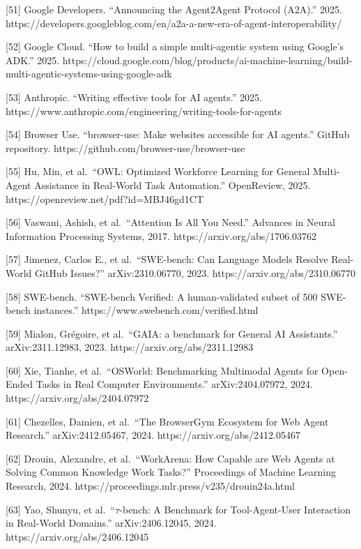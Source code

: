 {[}51{]} Google Developers. ``Announcing the Agent2Agent Protocol
(A2A).'' 2025.
https://developers.googleblog.com/en/a2a-a-new-era-of-agent-interoperability/

{[}52{]} Google Cloud. ``How to build a simple multi-agentic system
using Google's ADK.'' 2025.
https://cloud.google.com/blog/products/ai-machine-learning/build-multi-agentic-systems-using-google-adk

{[}53{]} Anthropic. ``Writing effective tools for AI agents.'' 2025.
https://www.anthropic.com/engineering/writing-tools-for-agents

{[}54{]} Browser Use. ``browser-use: Make websites accessible for AI
agents.'' GitHub repository. https://github.com/browser-use/browser-use

{[}55{]} Hu, Min, et al.~``OWL: Optimized Workforce Learning for General
Multi-Agent Assistance in Real-World Task Automation.'' OpenReview,
2025. https://openreview.net/pdf?id=MBJ46gd1CT

{[}56{]} Vaswani, Ashish, et al.~``Attention Is All You Need.'' Advances
in Neural Information Processing Systems, 2017.
https://arxiv.org/abs/1706.03762

{[}57{]} Jimenez, Carlos E., et al.~``SWE-bench: Can Language Models
Resolve Real-World GitHub Issues?'' arXiv:2310.06770, 2023.
https://arxiv.org/abs/2310.06770

{[}58{]} SWE-bench. ``SWE-bench Verified: A human-validated subset of
500 SWE-bench instances.'' https://www.swebench.com/verified.html

{[}59{]} Mialon, Grégoire, et al.~``GAIA: a benchmark for General AI
Assistants.'' arXiv:2311.12983, 2023. https://arxiv.org/abs/2311.12983

{[}60{]} Xie, Tianhe, et al.~``OSWorld: Benchmarking Multimodal Agents
for Open-Ended Tasks in Real Computer Environments.'' arXiv:2404.07972,
2024. https://arxiv.org/abs/2404.07972

{[}61{]} Chezelles, Damien, et al.~``The BrowserGym Ecosystem for Web
Agent Research.'' arXiv:2412.05467, 2024.
https://arxiv.org/abs/2412.05467

{[}62{]} Drouin, Alexandre, et al.~``WorkArena: How Capable are Web
Agents at Solving Common Knowledge Work Tasks?'' Proceedings of Machine
Learning Research, 2024.
https://proceedings.mlr.press/v235/drouin24a.html

{[}63{]} Yao, Shunyu, et al.~``\(\tau\)-bench: A Benchmark for
Tool-Agent-User Interaction in Real-World Domains.'' arXiv:2406.12045,
2024. https://arxiv.org/abs/2406.12045

